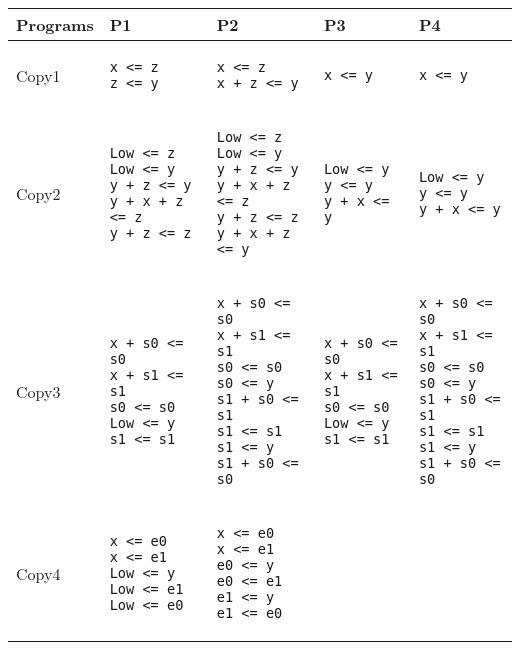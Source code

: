 \documentclass{article}
\begin{document}
\hspace{-3cm}
\begin{tabular}{|l|l|l|l|l|}
\hline
Programs  &  P1 & P2 & P3 & P4 \\
\hline
Copy1&
\begin{lstlisting}
x <= z
z <= y
\end{lstlisting}&
\begin{lstlisting}
x <= z
x + z <= y
\end{lstlisting}&
\begin{lstlisting}
x <= y
\end{lstlisting}&
\begin{lstlisting}
x <= y
\end{lstlisting}\\
\hline
Copy2&
\begin{lstlisting}
Low <= z
Low <= y
y + z <= y
y + x + z <= z
y + z <= z
\end{lstlisting}&
 \begin{lstlisting}
Low <= z
Low <= y
y + z <= y
y + x + z <= z
y + z <= z
y + x + z <= y
\end{lstlisting}&
 \begin{lstlisting}
Low <= y
y <= y
y + x <= y
\end{lstlisting}&
 \begin{lstlisting}
Low <= y
y <= y
y + x <= y
 \end{lstlisting}
\\
\hline
Copy3&
\begin{lstlisting}
x + s0 <= s0
x + s1 <= s1
s0 <= s0
Low <= y
s1 <= s1
\end{lstlisting}&
\begin{lstlisting}
x + s0 <= s0
x + s1 <= s1
s0 <= s0
s0 <= y
s1 + s0 <= s1
s1 <= s1
s1 <= y
s1 + s0 <= s0
\end{lstlisting}&
\begin{lstlisting}
x + s0 <= s0
x + s1 <= s1
s0 <= s0
Low <= y
s1 <= s1
\end{lstlisting}&
\begin{lstlisting}
x + s0 <= s0
x + s1 <= s1
s0 <= s0
s0 <= y
s1 + s0 <= s1
s1 <= s1
s1 <= y
s1 + s0 <= s0
\end{lstlisting}
\\
\hline
Copy4&
\begin{lstlisting}
x <= e0
x <= e1
Low <= y
Low <= e1
Low <= e0
\end{lstlisting}&
\begin{lstlisting}
x <= e0
x <= e1
e0 <= y
e0 <= e1
e1 <= y
e1 <= e0
\end{lstlisting}&

\end{tabular}
\end{document}
